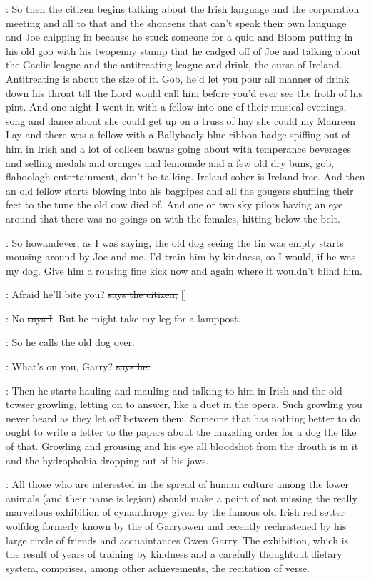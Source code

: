 \Nq:
So then the citizen begins talking about the Irish language and the
corporation meeting
and all to that and the shoneens that can't speak
their own language and Joe chipping in because he stuck someone for
a quid and Bloom putting in his old goo with his twopenny stump that
he cadged off of Joe and talking about the Gaelic league and the
antitreating league and drink, the curse of Ireland. Antitreating
is about the size of it. Gob, he'd let you pour all manner of drink
down his throat till the Lord would call him before you'd ever
see the froth of his pint. And one night I went in with a fellow
into one of their musical evenings, song and dance about she could
get up on a truss of hay she could my Maureen Lay and there was a fellow
with a Ballyhooly blue ribbon badge spiffing out of him in Irish and a lot
of colleen bawns going about with temperance beverages
and selling medals
and oranges and lemonade and a few old dry buns, gob, flahoolagh
entertainment, don't be talking. Ireland sober is Ireland free. And then
an old fellow starts blowing into his bagpipes and all the gougers
shuffling their feet to the tune the old cow died of. And one or two sky
pilots having an eye around that there was no goings on with the females,
hitting below the belt.

\Nq:
So howandever, as I was saying, the old dog seeing the tin was empty
starts mousing around by Joe and me. I'd train him by kindness, so I
would, if he was my dog. Give him a rousing fine kick now and again where
it wouldn't blind him.%

\citizen:
Afraid he'll bite you?
\sout{says the citizen,} []

:
No \sout{says I}. But he might take my leg for a lamppost.

\Nq:
So he calls the old dog over.

\citizen:
What's on you, Garry? \sout{says he.}

\Nq:
Then he starts hauling and mauling and talking to him in Irish and
the old towser growling, letting on to answer, like a duet in the opera.
Such growling you never heard as they let off between them. Someone that
has nothing better to do ought to write a letter  to the
papers about the muzzling order for a dog the like of that. Growling and
grousing and his eye all bloodshot from the drouth is in it
and the
hydrophobia dropping out of his jaws.

:
All those who are interested in the spread of human culture among
the lower animals (and their name is legion) should make a point of not
missing the really marvellous exhibition of cynanthropy given by the
famous old Irish red setter wolfdog formerly known by the  of
Garryowen and recently rechristened by his large circle of friends and
acquaintances Owen Garry. The exhibition, which is the result of years of
training by kindness and a carefully thoughtout dietary system, comprises,
among other achievements, the recitation of verse.

